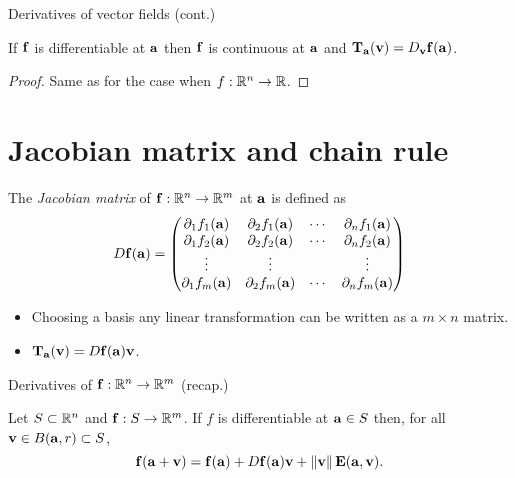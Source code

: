 {Derivatives of vector fields (cont.)}

\begin{theorem}
    If \(\ff\) is differentiable at \(\aa\)
    then \(\ff\) is continuous at \(\aa\)
    and \( \mathbf{T}_{\aa}( \vv) =D_{\vv}\ff(\aa) \).
\end{theorem}

\begin{proof}
    Same as for the case when \(f:\bR^n \to \bR\).
\end{proof}





\section{Jacobian matrix and chain rule}


\begin{definition}
    The \emph{Jacobian matrix} of \(\ff : \bR^n \to \bR^m\) at \(\aa\) is defined as
    \[
        D\ff(\aa) =
        \begin{pmatrix}
            \partial_1 f_1 (\aa) & \partial_2 f_1 (\aa) & \cdots & \partial_n f_1 (\aa) \\
            \partial_1 f_2 (\aa) & \partial_2 f_2 (\aa) & \cdots & \partial_n f_2 (\aa) \\
            \vdots               & \vdots               &        & \vdots               \\
            \partial_1 f_m (\aa) & \partial_2 f_m (\aa) & \cdots & \partial_n f_m (\aa)
        \end{pmatrix}
    \]

\end{definition}




\begin{itemize}
    \item Choosing a basis any linear transformation can be written as a \(m \times n\) matrix.
    \item \( \mathbf{T}_\aa  (\vv ) = D\ff(\aa) \vv\).
\end{itemize}



{Derivatives of \(\ff : \bR^n \to \bR^m\) (recap.)}


Let \(S\subset \bR^n\) and \(\ff : S \to \bR^m\).
If \(f\) is differentiable at \(\aa \in S\) then, for all  \(\vv\in B(\aa,r) \subset S\),
\[
    \ff(\aa+\vv) = \ff(\aa) +  D\ff(\aa) \vv + \norm{\vv}\mathbf{E}(\aa,\vv).
\]


